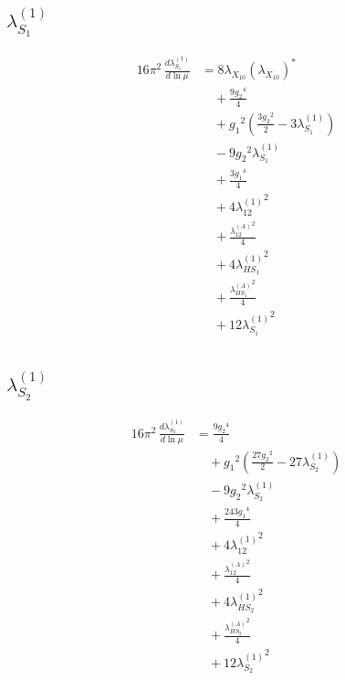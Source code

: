 \documentclass[10pt,a4paper]{article}
\begin{document}
\subsection*{$\lambda_{S_1}^{(1)}$}
\begin{align*}
16\pi^2\,\frac{d \lambda_{S_1}^{(1)}}{d\ln\mu} &=8 {\lambda_{X_{10}}} \left({\lambda_{X_{10}}}\right)^{*} \\
&\quad +\frac{9 {g_2}^4}{4} \\
&\quad +{g_1}^2 \left(\frac{3 {g_2}^2}{2}-3 {\lambda_{S_1}^{(1)}}\right) \\
&\quad -9 {g_2}^2 {\lambda_{S_1}^{(1)}} \\
&\quad +\frac{3 {g_1}^4}{4} \\
&\quad +4 {\lambda_{12}^{(1)}}^2 \\
&\quad +\frac{{\lambda_{12}^{(A)}}^2}{4} \\
&\quad +4 {\lambda_{HS_1}^{(1)}}^2 \\
&\quad +\frac{{\lambda_{HS_1}^{(A)}}^2}{4} \\
&\quad +12 {\lambda_{S_1}^{(1)}}^2 \\
\end{align*}
\subsection*{$\lambda_{S_2}^{(1)}$}
\begin{align*}
16\pi^2\,\frac{d \lambda_{S_2}^{(1)}}{d\ln\mu} &=\frac{9 {g_2}^4}{4} \\
&\quad +{g_1}^2 \left(\frac{27 {g_2}^2}{2}-27 {\lambda_{S_2}^{(1)}}\right) \\
&\quad -9 {g_2}^2 {\lambda_{S_2}^{(1)}} \\
&\quad +\frac{243 {g_1}^4}{4} \\
&\quad +4 {\lambda_{12}^{(1)}}^2 \\
&\quad +\frac{{\lambda_{12}^{(A)}}^2}{4} \\
&\quad +4 {\lambda_{HS_2}^{(1)}}^2 \\
&\quad +\frac{{\lambda_{HS_2}^{(A)}}^2}{4} \\
&\quad +12 {\lambda_{S_2}^{(1)}}^2 \\
\end{align*}
\end{document}
